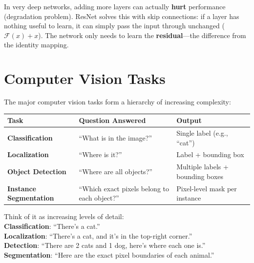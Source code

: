 \documentclass[11pt,a4paper]{article}
\begin{document}
\begin{tcolorbox}[intuitionbox={Why ResNet Works}]
In very deep networks, adding more layers can actually \textbf{hurt} performance (degradation problem). ResNet solves this with skip connections: if a layer has nothing useful to learn, it can simply pass the input through unchanged ($\mathcal{F}(x) + x$). The network only needs to learn the \textbf{residual}---the difference from the identity mapping.
\end{tcolorbox}

\section{Computer Vision Tasks}

The major computer vision tasks form a hierarchy of increasing complexity:

\begin{center}
\renewcommand{\arraystretch}{1.4}
\begin{tabular}{@{}p{3.5cm}p{4.5cm}p{5cm}@{}}
\toprule
\textbf{Task} & \textbf{Question Answered} & \textbf{Output} \\
\midrule
\textbf{Classification} & ``What is in the image?'' & Single label (e.g., ``cat'') \\
\textbf{Localization} & ``Where is it?'' & Label + bounding box \\
\textbf{Object Detection} & ``Where are all objects?'' & Multiple labels + bounding boxes \\
\textbf{Instance Segmentation} & ``Which exact pixels belong to each object?'' & Pixel-level mask per instance \\
\bottomrule
\end{tabular}
\end{center}

\begin{tcolorbox}[intuitionbox={Intuition}]
Think of it as increasing levels of detail:\\
\textbf{Classification}: ``There's a cat.''\\
\textbf{Localization}: ``There's a cat, and it's in the top-right corner.''\\
\textbf{Detection}: ``There are 2 cats and 1 dog, here's where each one is.''\\
\textbf{Segmentation}: ``Here are the exact pixel boundaries of each animal.''
\end{tcolorbox}
\end{document}
